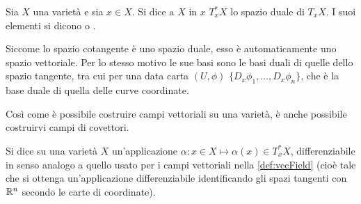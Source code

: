 \begin{definition}
  Sia $X$ una varietà e sia $x \in X$. Si dice  a $X$ in $x$ $T_x^* X$ lo spazio duale di $T_x X$. I suoi elementi si dicono  o .
\end{definition}
\begin{remark} \label{rem:dualBasis}
  Siccome lo spazio cotangente è uno spazio duale, esso è automaticamente uno spazio vettoriale. Per lo stesso motivo le sue basi sono le basi duali di quelle dello spazio tangente, tra cui per una data carta $(U, \phi)$ $\{D_x \phi_1, \ldots, D_x \phi_n\} $, che è la base duale di quella delle curve coordinate.
\end{remark}



Così come è possibile costruire campi vettoriali su una varietà, è anche possibile costruirvi campi di covettori.
\begin{definition} \label{def:1formCvc}
  Si dice  su una varietà $X$ un'applicazione $\alpha: x \in X \mapsto \alpha(x) \in T_x^* X$, differenziabile in senso analogo a quello usato per i campi vettoriali nella \autoref{def:vecField} (cioè tale che si ottenga un'applicazione differenziabile identificando gli spazi tangenti con $\mathbb{R}^{n}$ secondo le carte di coordinate).
\end{definition}

